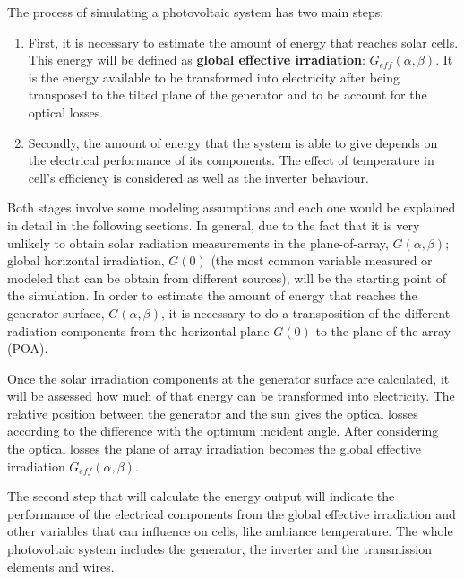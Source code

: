 The process of simulating a photovoltaic system has two main steps:

\begin{enumerate}
\item First, it is necessary to estimate the amount of energy that reaches solar cells. This energy will be defined as \textbf{global effective irradiation}: $G_{eff}(\alpha, \beta)$. It is the energy available to be transformed into electricity after being transposed to the tilted plane of the generator and to be account for the optical losses.
  \item Secondly, the amount of energy that the system is able to give depends on the electrical performance of its components. The effect of temperature in cell's efficiency is considered as well as the inverter behaviour.
  \end{enumerate}
  
Both stages involve some modeling assumptions and each one would be explained in detail in the following sections. In general, due to the fact that it is very unlikely to obtain solar radiation measurements in the plane-of-array, $G(\alpha, \beta)$; global horizontal irradiation, $G(0)$ (the most common variable measured or modeled that can be obtain from different sources), will be the starting point of the simulation. In order to estimate the amount of energy that reaches the generator surface, $G(\alpha, \beta)$, it is necessary to do a transposition of the different radiation components from the horizontal plane $G(0)$ to the plane of the array (POA).

Once the solar irradiation components at the generator surface are calculated, it will be assessed how much of that energy can be transformed into electricity. The relative position between the generator and the sun gives the optical losses according to the difference with the optimum incident angle. After considering the optical losses the plane of array irradiation becomes the global effective irradiation $G_{eff}(\alpha, \beta)$.

The second step that will calculate the energy output will indicate the performance of the electrical components from the global effective irradiation and other variables that can influence on cells, like ambiance temperature. The whole photovoltaic system includes the generator, the inverter and the transmission elements and wires.

